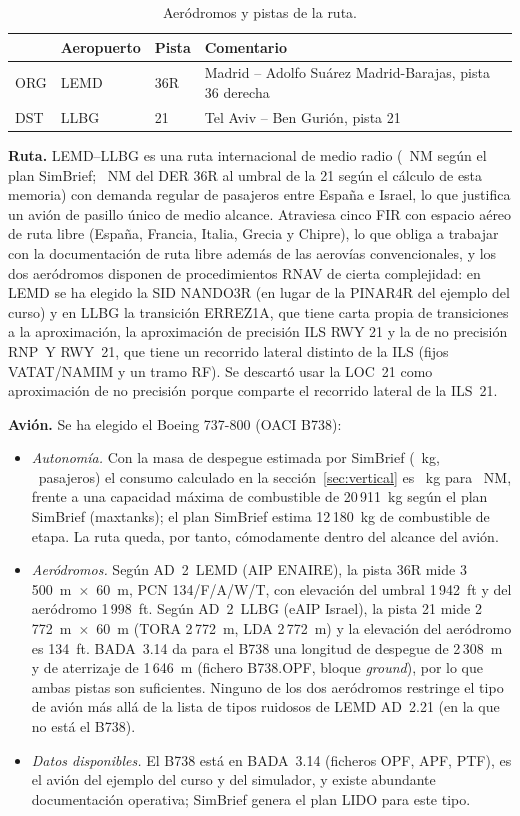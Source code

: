 \documentclass[11pt,a4paper]{article}
\DeclareRobustCommand{\m}[1]{{\ttfamily\def\_{\textunderscore\penalty100\relax}#1}}
\begin{document}
\begin{table}[H]\centering\small
\begin{tabular}{llll}\toprule
 & Aeropuerto & Pista & Comentario\\ \midrule
ORG & LEMD & 36R & Madrid -- Adolfo Suárez Madrid-Barajas, pista 36 derecha\\
DST & LLBG & 21 & Tel Aviv -- Ben Gurión, pista 21\\ \bottomrule
\end{tabular}
\caption{Aeródromos y pistas de la ruta.}
\end{table}

\textbf{Ruta.} LEMD--LLBG es una ruta internacional de medio radio (\sbDist~NM según el plan SimBrief; \vTotalD~NM del DER 36R al umbral de la 21 según el cálculo de esta memoria) con demanda regular de pasajeros entre España e Israel, lo que justifica un avión de pasillo único de medio alcance. Atraviesa cinco FIR con espacio aéreo de ruta libre (España, Francia, Italia, Grecia y Chipre), lo que obliga a trabajar con la documentación de ruta libre además de las aerovías convencionales, y los dos aeródromos disponen de procedimientos RNAV de cierta complejidad: en LEMD se ha elegido la SID NANDO3R (en lugar de la PINAR4R del ejemplo del curso) y en LLBG la transición ERREZ1A, que tiene carta propia de transiciones a la aproximación, la aproximación de precisión ILS RWY 21 y la de no precisión RNP~Y RWY~21, que tiene un recorrido lateral distinto de la ILS (fijos VATAT/NAMIM y un tramo RF). Se descartó usar la LOC~21 como aproximación de no precisión porque comparte el recorrido lateral de la ILS~21.

\textbf{Avión.} Se ha elegido el Boeing 737-800 (OACI B738):
\begin{itemize}
\item \emph{Autonomía.} Con la masa de despegue estimada por SimBrief (\sbTOW~kg, \sbPax~pasajeros) el consumo calculado en la sección~\ref{sec:vertical} es \vFuelTot~kg para \vTotalD~NM, frente a una capacidad máxima de combustible de 20\,911~kg según el plan SimBrief (\m{max\_tanks}); el plan SimBrief estima 12\,180~kg de combustible de etapa. La ruta queda, por tanto, cómodamente dentro del alcance del avión.
\item \emph{Aeródromos.} Según AD~2~LEMD (AIP ENAIRE), la pista 36R mide 3\,500~m~$\times$~60~m, PCN 134/F/A/W/T, con elevación del umbral 1\,942~ft y del aeródromo 1\,998~ft. Según AD~2~LLBG (eAIP Israel), la pista 21 mide 2\,772~m~$\times$~60~m (TORA 2\,772~m, LDA 2\,772~m) y la elevación del aeródromo es 134~ft. BADA~3.14 da para el B738 una longitud de despegue de 2\,308~m y de aterrizaje de 1\,646~m (fichero \m{B738\_\_.OPF}, bloque \emph{ground}), por lo que ambas pistas son suficientes. Ninguno de los dos aeródromos restringe el tipo de avión más allá de la lista de tipos ruidosos de LEMD AD~2.21 (en la que no está el B738).
\item \emph{Datos disponibles.} El B738 está en BADA~3.14 (ficheros OPF, APF, PTF), es el avión del ejemplo del curso y del simulador, y existe abundante documentación operativa; SimBrief genera el plan LIDO para este tipo.
\end{itemize}
\end{document}
